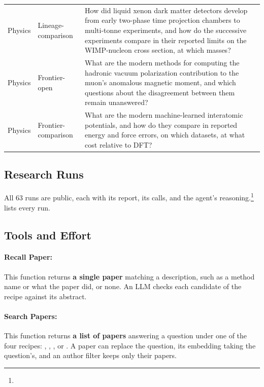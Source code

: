 \begin{table}[H]
\begin{tabular}{llp{}}
Physics & Lineage-comparison & How did liquid xenon dark matter detectors develop from early two-phase time projection chambers to multi-tonne experiments, and how do the successive experiments compare in their reported limits on the WIMP-nucleon cross section, at which masses? \\
Physics & Frontier-open & What are the modern methods for computing the hadronic vacuum polarization contribution to the muon's anomalous magnetic moment, and which questions about the disagreement between them remain unanswered? \\
Physics & Frontier-comparison & What are the modern machine-learned interatomic potentials, and how do they compare in reported energy and force errors, on which datasets, at what cost relative to DFT? \\
\bottomrule
\end{tabular}
\end{table}

\FloatBarrier
\subsection{Research Runs}
\label{app:runs}

All 63 runs are public, each with its report, its calls, and the agent's reasoning.\footnote{}  lists every run.



\subsection{Tools and Effort}
\label{app:agent}

\paragraph{Recall Paper:}
This function returns \textbf{a single paper} matching a description, such as a method name or what the paper did, or none. An LLM checks each candidate of the  recipe against its abstract.

\paragraph{Search Papers:}
This function returns \textbf{a list of papers} answering a question under one of the four recipes: , , , or . A paper can replace the question, its embedding taking the question's, and an author filter keeps only their papers.

